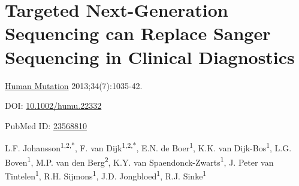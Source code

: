 \chapter[targeted NGS can replace Sanger sequencing in clinical diagnostics]{Targeted Next-Generation Sequencing can Replace Sanger Sequencing in Clinical Diagnostics}
\label{chap:SNP and Indel detection}

{ \Large {} }

\hfill \underline{Human Mutation} 2013;34(7):1035-42.

\hfill DOI: \href{https://doi.org/10.1002/humu.22332}{10.1002/humu.22332}

\hfill PubMed ID: \href{https://www.ncbi.nlm.nih.gov/pubmed/23568810}{23568810}

\newpage

\noindent
L.F. Johansson\textsuperscript{1,2,*}, F. van Dijk\textsuperscript{1,2,*}, E.N. de Boer\textsuperscript{1}, K.K. van Dijk-Bos\textsuperscript{1}, L.G. Boven\textsuperscript{1}, M.P. van den Berg\textsuperscript{2}, K.Y. van Spaendonck-Zwarts\textsuperscript{1}, J. Peter van Tintelen\textsuperscript{1}, R.H. Sijmons\textsuperscript{1}, J.D. Jongbloed\textsuperscript{1},  R.J. Sinke\textsuperscript{1} \\

